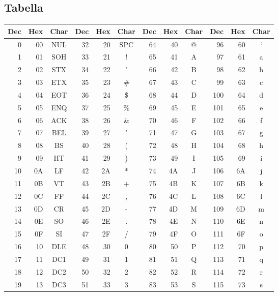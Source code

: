 \subsection{Tabella}
\begin{table}[htbp]
\centering
\small
\begin{tabular}{rrc|rrc|rrc|rrc}
\toprule
\textbf{Dec} & \textbf{Hex} & \textbf{Char} & \textbf{Dec} & \textbf{Hex} & \textbf{Char} & \textbf{Dec} & \textbf{Hex} & \textbf{Char} & \textbf{Dec} & \textbf{Hex} & \textbf{Char} \\
\midrule
0  & 00 & NUL & 32 & 20 & SPC & 64  & 40 & @  & 96  & 60 & ` \\
1  & 01 & SOH & 33 & 21 & !   & 65  & 41 & A  & 97  & 61 & a \\
2  & 02 & STX & 34 & 22 & "   & 66  & 42 & B  & 98  & 62 & b \\
3  & 03 & ETX & 35 & 23 & \#  & 67  & 43 & C  & 99  & 63 & c \\
4  & 04 & EOT & 36 & 24 & \$  & 68  & 44 & D  & 100 & 64 & d \\
5  & 05 & ENQ & 37 & 25 & \%  & 69  & 45 & E  & 101 & 65 & e \\
6  & 06 & ACK & 38 & 26 & \&  & 70  & 46 & F  & 102 & 66 & f \\
7  & 07 & BEL & 39 & 27 & '   & 71  & 47 & G  & 103 & 67 & g \\
8  & 08 & BS  & 40 & 28 & (   & 72  & 48 & H  & 104 & 68 & h \\
9  & 09 & HT  & 41 & 29 & )   & 73  & 49 & I  & 105 & 69 & i \\
10 & 0A & LF  & 42 & 2A & *   & 74  & 4A & J  & 106 & 6A & j \\
11 & 0B & VT  & 43 & 2B & +   & 75  & 4B & K  & 107 & 6B & k \\
12 & 0C & FF  & 44 & 2C & ,   & 76  & 4C & L  & 108 & 6C & l \\
13 & 0D & CR  & 45 & 2D & -   & 77  & 4D & M  & 109 & 6D & m \\
14 & 0E & SO  & 46 & 2E & .   & 78  & 4E & N  & 110 & 6E & n \\
15 & 0F & SI  & 47 & 2F & /   & 79  & 4F & O  & 111 & 6F & o \\
16 & 10 & DLE & 48 & 30 & 0   & 80  & 50 & P  & 112 & 70 & p \\
17 & 11 & DC1 & 49 & 31 & 1   & 81  & 51 & Q  & 113 & 71 & q \\
18 & 12 & DC2 & 50 & 32 & 2   & 82  & 52 & R  & 114 & 72 & r \\
19 & 13 & DC3 & 51 & 33 & 3   & 83  & 53 & S  & 115 & 73 & s \\

\end{tabular}
\end{table}
